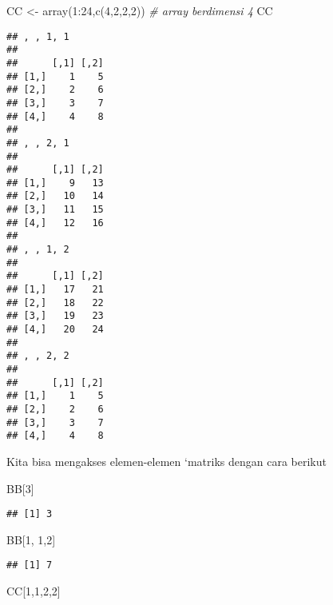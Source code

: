 \documentclass[
]{book}
\newenvironment{Shaded}{\begin{snugshade}}{\end{snugshade}}
\newcommand{\CommentTok}[1]{\textcolor[rgb]{0.56,0.35,0.01}{\textit{#1}}}
\newcommand{\DecValTok}[1]{\textcolor[rgb]{0.00,0.00,0.81}{#1}}
\newcommand{\FunctionTok}[1]{\textcolor[rgb]{0.00,0.00,0.00}{#1}}
\newcommand{\NormalTok}[1]{#1}
\newcommand{\OtherTok}[1]{\textcolor[rgb]{0.56,0.35,0.01}{#1}}
\newcommand{\SpecialCharTok}[1]{\textcolor[rgb]{0.00,0.00,0.00}{#1}}
\begin{document}
\begin{Shaded}
\begin{Highlighting}[]
\NormalTok{CC }\OtherTok{\textless{}{-}} \FunctionTok{array}\NormalTok{(}\DecValTok{1}\SpecialCharTok{:}\DecValTok{24}\NormalTok{,}\FunctionTok{c}\NormalTok{(}\DecValTok{4}\NormalTok{,}\DecValTok{2}\NormalTok{,}\DecValTok{2}\NormalTok{,}\DecValTok{2}\NormalTok{)) }\CommentTok{\# array berdimensi 4}
\NormalTok{CC}
\end{Highlighting}
\end{Shaded}

\begin{verbatim}
## , , 1, 1
## 
##      [,1] [,2]
## [1,]    1    5
## [2,]    2    6
## [3,]    3    7
## [4,]    4    8
## 
## , , 2, 1
## 
##      [,1] [,2]
## [1,]    9   13
## [2,]   10   14
## [3,]   11   15
## [4,]   12   16
## 
## , , 1, 2
## 
##      [,1] [,2]
## [1,]   17   21
## [2,]   18   22
## [3,]   19   23
## [4,]   20   24
## 
## , , 2, 2
## 
##      [,1] [,2]
## [1,]    1    5
## [2,]    2    6
## [3,]    3    7
## [4,]    4    8
\end{verbatim}

Kita bisa mengakses elemen-elemen `matriks dengan cara berikut

\begin{Shaded}
\begin{Highlighting}[]
\NormalTok{BB[}\DecValTok{3}\NormalTok{]}
\end{Highlighting}
\end{Shaded}

\begin{verbatim}
## [1] 3
\end{verbatim}

\begin{Shaded}
\begin{Highlighting}[]
\NormalTok{BB[}\DecValTok{1}\NormalTok{, }\DecValTok{1}\NormalTok{,}\DecValTok{2}\NormalTok{]}
\end{Highlighting}
\end{Shaded}

\begin{verbatim}
## [1] 7
\end{verbatim}

\begin{Shaded}
\begin{Highlighting}[]
\NormalTok{CC[}\DecValTok{1}\NormalTok{,}\DecValTok{1}\NormalTok{,}\DecValTok{2}\NormalTok{,}\DecValTok{2}\NormalTok{]}
\end{Highlighting}
\end{Shaded}
\end{document}
